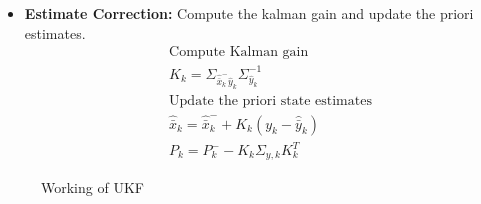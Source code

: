 \begin{itemize}
\begin{itemize}
        \item \textbf{Estimate Correction:} Compute the kalman gain and update the priori estimates.
        \begin{equation}
        \begin{split}
        &\text{Compute Kalman gain}\\
        &K_k = \Sigma_{\hat{\bar x}_k^- \hat y_k} \Sigma_{\hat y_k}^{-1}\\
        &\text{Update the priori state estimates}\\
        &\hat{\bar{x}}_k = \hat{\bar{x}}_k^- + K_k(y_k - \hat{\bar y}_k)\\
        &P_k = P_k^- - K_k \Sigma_{y,k} K_k^T
        \end{split}
        \end{equation}
    \end{itemize}
\end{itemize}
\begin{figure}  

\caption{Working of UKF}
\label{fig:ukf_blk}
\end{figure}
